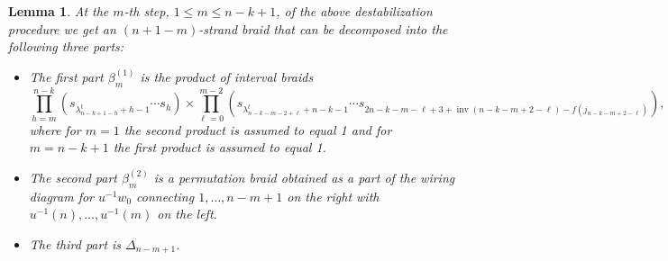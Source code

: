 \documentclass[10pt]{amsart}
\theoremstyle{plain}
\newtheorem{lemma}[thm]{Lemma}
\theoremstyle{definition}
\theoremstyle{remark}
\numberwithin{equation}{section}
\DeclareMathOperator{\inv}{inv}
\begin{document}
\begin{lemma}
\label{lem: inductive destabilization}
At the $m$-th step, $1\le m\le n-k+1$, of the above destabilization procedure we get an $(n+1-m)$-strand braid  that can be decomposed into the following three parts:
\begin{itemize}
    \item[(a)] The first part $\beta^{(1)}_{m}$ is the product of interval braids
\[
\prod_{h = m}^{n-k}\left(s_{\lambda^{t}_{n-k+1-h}+h-1}\cdots s_h\right) \times
\prod_{\ell = 0}^{m-2}\left(s_{\lambda^{t}_{n-k-m-2+\ell}+n-k-1}\cdots s_{2n-k-m-\ell+3+\inv(n-k-m+2-\ell)-f(j_{n-k-m+2-\ell})}\right),
\]    
where for $m=1$ the second product is assumed to equal 1 and for $m = n-k+1$ the first product is assumed to equal 1.

\vspace{0.1cm}

\item[(b)] The second part $\beta^{(2)}_{m}$ is a permutation braid obtained as a part of the wiring diagram for $u^{-1}w_0$ connecting $1, \dots, n-m+1$ on the right with $u^{-1}(n),\ldots,u^{-1}(m)$ on the left.\\%

\item[(c)] The third part is $\Delta_{n-m+1}$.   \end{itemize}
\end{lemma}
\end{document}
